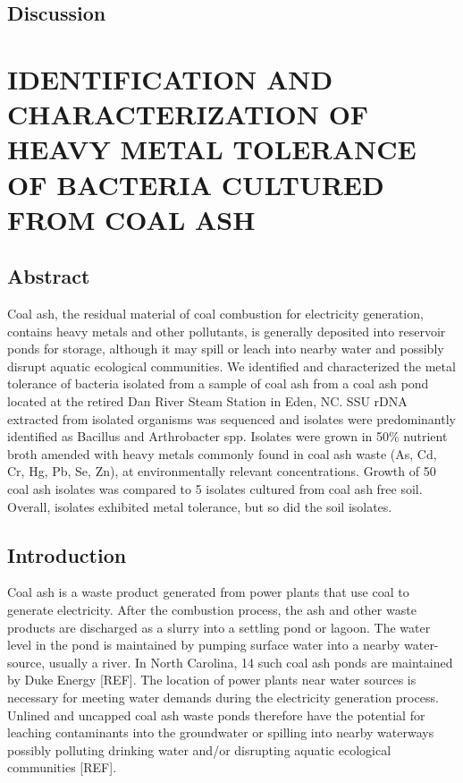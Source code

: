 \documentclass[ms]{uncgdissertationexp}
\theoremstyle{plain}
\theoremstyle{definition}
\theoremstyle{remark}
\begin{document}
  \section{Discussion}\label{discussion}
  
  \chapter{IDENTIFICATION AND CHARACTERIZATION OF HEAVY METAL TOLERANCE OF
  BACTERIA CULTURED FROM COAL ASH}\label{math-sci}
  
  \section{Abstract}\label{abstract-1}
  
  Coal ash, the residual material of coal combustion for electricity
  generation, contains heavy metals and other pollutants, is generally
  deposited into reservoir ponds for storage, although it may spill or
  leach into nearby water and possibly disrupt aquatic ecological
  communities. We identified and characterized the metal tolerance of
  bacteria isolated from a sample of coal ash from a coal ash pond located
  at the retired Dan River Steam Station in Eden, NC. SSU rDNA extracted
  from isolated organisms was sequenced and isolates were predominantly
  identified as Bacillus and Arthrobacter spp. Isolates were grown in 50\%
  nutrient broth amended with heavy metals commonly found in coal ash
  waste (As, Cd, Cr, Hg, Pb, Se, Zn), at environmentally relevant
  concentrations. Growth of 50 coal ash isolates was compared to 5
  isolates cultured from coal ash free soil. Overall, isolates exhibited
  metal tolerance, but so did the soil isolates.
  
  \section{Introduction}\label{introduction-1}
  
  Coal ash is a waste product generated from power plants that use coal to
  generate electricity. After the combustion process, the ash and other
  waste products are discharged as a slurry into a settling pond or
  lagoon. The water level in the pond is maintained by pumping surface
  water into a nearby water-source, usually a river. In North Carolina, 14
  such coal ash ponds are maintained by Duke Energy {[}REF{]}. The
  location of power plants near water sources is necessary for meeting
  water demands during the electricity generation process. Unlined and
  uncapped coal ash waste ponds therefore have the potential for leaching
  contaminants into the groundwater or spilling into nearby waterways
  possibly polluting drinking water and/or disrupting aquatic ecological
  communities {[}REF{]}.
  
\end{document}
